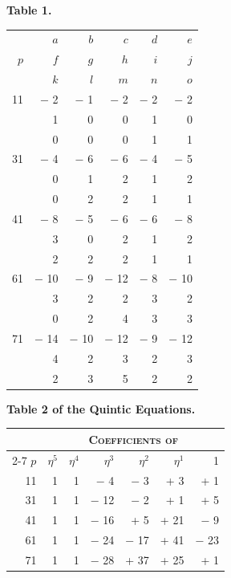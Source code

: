 \documentclass[11pt,a4paper,english]{article}
\theoremstyle{plain}
\begin{document}
\newpage
\begin{center}
\textbf{Table 1.}
\end{center}

\begin{center}
\begin{tabular}{r | r r r r r}
\multirow{3}{*}{$p$} & $a$ & $b$ & $c$ & $d$ & $e$ \\
 & $f$ & $g$ & $h$ & $i$ & $j$ \\
 & $k$ & $l$ & $m$ & $n$ & $o$ \\ \hline
11 & $-$ 2 & $-$ 1 & $-$ 2 & $-$ 2 & $-$ 2 \\
 & 1 & 0 & 0 & 1 & 0 \\
 & 0 & 0 & 0 & 1 & 1 \\[2pt]
31 & $-$ 4 & $-$ 6 & $-$ 6 & $-$ 4 & $-$ 5 \\
 & 0 & 1 & 2 & 1 & 2 \\
 & 0 & 2 & 2 & 1 & 1 \\[2pt]
41 & $-$ 8 & $-$ 5 & $-$ 6 & $-$ 6 & $-$ 8 \\
 & 3 & 0 & 2 & 1 & 2 \\
 & 2 & 2 & 2 & 1 & 1 \\[2pt]
61 & $-$ 10 & $-$ 9 & $-$ 12 & $-$ 8 & $-$ 10 \\
 & 3 & 2 & 2 & 3 & 2 \\
 & 0 & 2 & 4 & 3 & 3 \\[2pt]
71 & $-$ 14 & $-$ 10 & $-$ 12 & $-$ 9 & $-$ 12 \\
 & 4 & 2 & 3 & 2 & 3 \\
 & 2 & 3 & 5 & 2 & 2 \\
\end{tabular}
\end{center}

\vspace{\baselineskip}

\begin{center}
\textbf{Table 2 of the Quintic Equations.}
\end{center}

\begin{center}
\begin{tabular}{r | r r r r r r}
 & \multicolumn{6}{c}{\textsc{Coefficients of}} \\ \cline{2-7}
$p$ & $\eta^5$ & $\eta^4$ & $\eta^3$ & $\eta^2$ & $\eta^1$ & 1 \\ \hline
11 & 1 & 1 & $-$ 4 & $-$ 3 & + 3 & + 1 \\
31 & 1 & 1 & $-$ 12 & $-$ 2 & + 1 & + 5 \\
41 & 1 & 1 & $-$ 16 & + 5 & + 21 & $-$ 9 \\
61 & 1 & 1 & $-$ 24 & $-$ 17 & + 41 & $-$ 23 \\
71 & 1 & 1 & $-$ 28 & + 37 & + 25 & + 1
\end{tabular}
\end{center}
\end{document}
